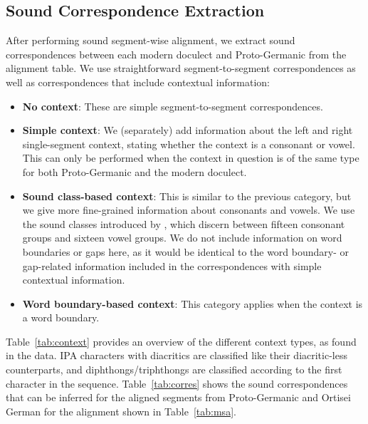 \documentclass[a4paper]{article}
\begin{document}
\subsection{Sound Correspondence Extraction}
\label{subsec:corres}

After performing sound segment-wise alignment,
we extract sound correspondences between each
modern doculect and Proto-Germanic from the alignment table.
We use straightforward segment-to-segment correspondences
as well as correspondences that include contextual information:

\begin{itemize}
\item
\textbf{No context}:
These are simple segment-to-segment correspondences.

\item
\textbf{Simple context}:
We (separately) add information about the
left and right single-segment context,
stating whether the context is a consonant or vowel. 
This can only be performed when the context in question is of
the same type for both Proto-Germanic and the modern doculect.

\item
\textbf{Sound class-based context}:
This is similar to the previous category,
but we give more fine-grained information about consonants and vowels.
We use the sound classes introduced by \citet{list2012sca},
which discern between fifteen consonant groups and sixteen vowel groups.
We do not include information on word boundaries or gaps here,
as it would be identical to the word boundary- or gap-related information
included in the correspondences with simple contextual information.

\item
\textbf{Word boundary-based context}:
This category applies when the context is a word boundary.

\end{itemize}

Table~\ref{tab:context} provides an overview
of the different context types, as found in the data.
IPA characters with diacritics are classified
like their diacritic-less counterparts,
and diphthongs/triphthongs are classified
according to the first character in the sequence.
Table~\ref{tab:corres} shows the sound correspondences
that can be inferred for the aligned segments
from Proto-Germanic and Ortisei German for the alignment
shown in Table~\ref{tab:msa}.
\end{document}
